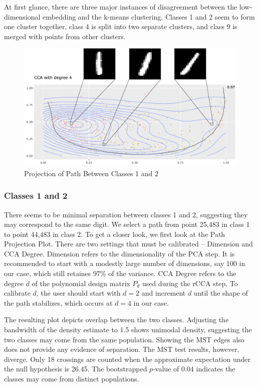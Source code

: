 \documentclass{article}
\begin{document}
At first glance, there are three major instances of disagreement between the low-dimensional embedding and the k-means clustering. Classes 1 and 2 seem to form one cluster together, class 4 is split into two separate clusters, and class 9 is merged with points from other clusters.

\renewcommand{\figurename}{Figure}
\renewcommand{\thefigure}{3}
\begin{figure}[!b]
\centering
\includegraphics[scale=0.4]{class 1+2 projection MNIST}
\caption{Projection of Path Between Classes 1 and 2}
\end{figure}

\subsubsection{Classes 1 and 2}
There seems to be minimal separation between classes 1 and 2, suggesting they may correspond to the same digit. We select a path from point 25,483 in class 1 to point 44,483 in class 2. To get a closer look, we first look at the Path Projection Plot. There are two settings that must be calibrated -- Dimension and CCA Degree. Dimension refers to the dimensionality of the PCA step. It is recommended to start with a modestly large number of dimensions, say 100 in our case, which still retaines 97\% of the variance. CCA Degree refers to the degree $d$ of the polynomial design matrix $P_d$ used during the rCCA step. To calibrate $d$, the user should start with $d = 2$ and increment $d$ until the shape of the path stabilizes, which occurs at $d = 4$ in our case.

The resulting plot depicts overlap between the two classes. Adjusting the bandwidth of the density estimate to 1.5 shows unimodal density, suggesting the two classes may come from the same population. Showing the MST edges also does not provide any evidence of separation. The MST test results, however, diverge. Only 18 crossings are counted when the approximate expectation under the null hypothesis is 26.45. The bootstrapped $p$-value of $0.04$ indicates the classes may come from distinct populations.
\end{document}
